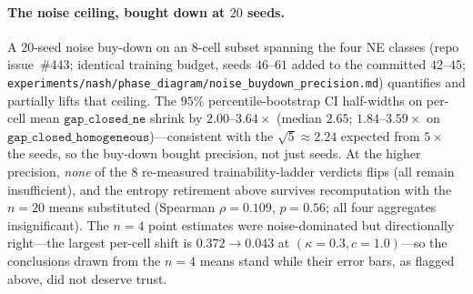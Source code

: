\documentclass{anvil-paper}
\begin{document}
\paragraph{The noise ceiling, bought down at $20$ seeds.}
A $20$-seed noise buy-down on an $8$-cell subset spanning the four NE
classes (repo issue~\#443; identical training budget, seeds $46$--$61$
added to the committed $42$--$45$;
\texttt{experiments/nash/phase\_diagram/noise\_buydown\_precision.md})
quantifies and partially lifts that ceiling. The $95\%$
percentile-bootstrap CI half-widths on per-cell mean
$\texttt{gap\_closed\_ne}$ shrink by $2.00$--$3.64{\times}$
(median $2.65$; $1.84$--$3.59{\times}$ on
$\texttt{gap\_closed\_homogeneous}$)---consistent with the
$\sqrt{5}\approx 2.24$ expected from $5{\times}$ the seeds, so the
buy-down bought precision, not just seeds. At the higher precision,
\emph{none} of the $8$ re-measured trainability-ladder verdicts flips
(all remain \textsf{insufficient}), and the entropy retirement above
survives recomputation with the $n{=}20$ means substituted (Spearman
$\rho{=}0.109$, $p{=}0.56$; all four aggregates insignificant). The
$n{=}4$ point estimates were noise-dominated but directionally
right---the largest per-cell shift is $0.372\to 0.043$ at
$(\kappa{=}0.3, c{=}1.0)$---so the conclusions drawn from the $n{=}4$
means stand while their error bars, as flagged above, did not deserve
trust.
\end{document}
